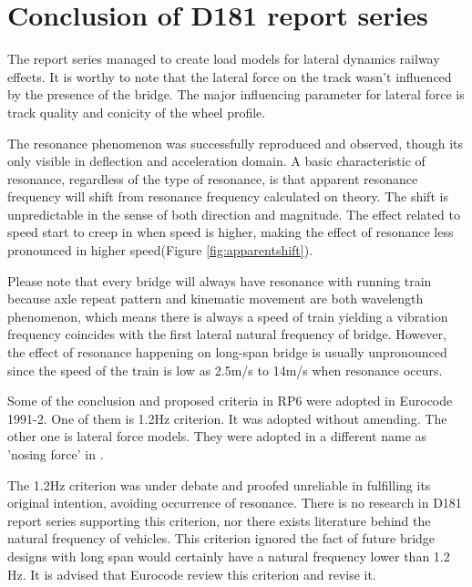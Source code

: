\section{Conclusion of D181 report series}
The report series managed to create load models for lateral dynamics railway effects. It is worthy to note that the lateral force on the track wasn't influenced by the presence of the bridge. The major influencing parameter for lateral force is track quality and conicity of the wheel profile. 

The resonance phenomenon was successfully reproduced and observed, though its only visible in deflection and acceleration domain. A basic characteristic of resonance, regardless of the type of resonance, is that apparent resonance frequency will shift from resonance frequency calculated on theory. The shift is unpredictable in the sense of both direction and magnitude. The effect related to speed start to creep in when speed is higher, making the effect of resonance less pronounced in higher speed(Figure \ref{fig:apparentshift}). 

Please note that every bridge will always have resonance with running train because axle repeat pattern and kinematic movement are both wavelength phenomenon, which means there is always a speed of train yielding a vibration frequency coincides with the first lateral natural frequency of bridge. However, the effect of resonance happening on long-span bridge is usually unpronounced since the speed of the train is low as 2.5m/s to 14m/s when resonance occurs.  

Some of the conclusion and proposed criteria in RP6 were adopted in Eurocode 1991-2. One of them is 1.2Hz criterion. It was adopted without amending. The other one is lateral force models. They were adopted in a different name as 'nosing force' in \cite[A6.5.2]{EC12}. 

The 1.2Hz criterion was under debate and proofed unreliable in fulfilling its original intention, avoiding occurrence of resonance. There is no research in D181 report series supporting this criterion, nor there exists literature behind the natural frequency of vehicles. This criterion ignored the fact of future bridge designs with long span would certainly have a natural frequency lower than 1.2 Hz. It is advised that Eurocode review this criterion and revise it.
